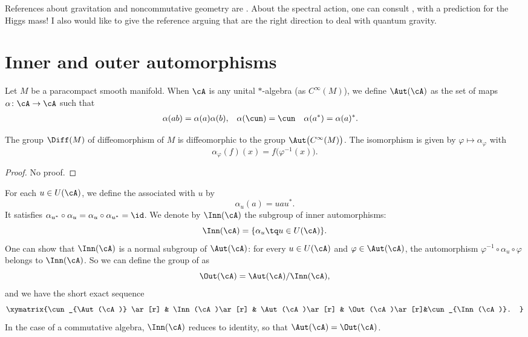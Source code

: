 
References about gravitation and noncommutative geometry are \cite{ConnesMotives,Landi,ConnesNCG,itoNCG_Varilly}. About the spectral action, one can consult \cite{SpectralActPrinciple}, with a prediction for the Higgs mass! I also would like to give the reference \cite{MrTopos} arguing that  are the right direction to deal with quantum gravity.

\section{Inner and outer automorphisms}

Let $M$ be a paracompact smooth manifold. When $\cA$ is any unital $*$-algebra (as $ C^{\infty}(M)$), we define $\Aut(\cA)$ as the set of maps $\alpha\colon \cA\to \cA$ such that
\begin{align}
	\alpha(ab) & =\alpha(a)\alpha(b),
	           & \alpha(\cun)         & =\cun
	           & \alpha(a^*)          & =\alpha(a)^*.
\end{align}

\begin{proposition}
	The group $\Diff(M)$ of diffeomorphism of $M$ is diffeomorphic to the group $\Aut\big(  C^{\infty}(M) \big)$. The isomorphism is given by $\varphi\mapsto\alpha_{\varphi}$ with
	\[
		\alpha_{\varphi}(f)(x)=f\big( \varphi^{-1}(x) \big).
	\]
\end{proposition}
\begin{proof}
	No proof.
\end{proof}

For each $u\in U(\cA)$, we define the  associated with $u$ by
\begin{equation}
	\alpha_u(a)=uau^*.
\end{equation}
It satisfies $\alpha_{u^*}\circ\alpha_{u}=\alpha_u\circ\alpha_{u^*}=\id$. We denote by $\Inn(\cA)$ the subgroup of inner automorphisms:
\[
	\Inn(\cA)=\{ \alpha_u\tq u\in U(\cA) \}.
\]
One can show that $\Inn(\cA)$ is a normal subgroup of $\Aut(\cA)$: for every $u\in U(\cA)$ and $\varphi\in\Aut(\cA)$, the automorphism $\varphi^{-1}\circ\alpha_u\circ\varphi$ belongs to $\Inn(\cA)$. So we can define the group of  as
\[
	\Out(\cA)=\Aut(\cA)/\Inn(\cA),
\]
and we have the short exact sequence
\begin{equation}
	\xymatrix{%
		\cun_{\Aut(\cA)} \ar[r]	&	\Inn(\cA)\ar[r]	&	\Aut(\cA)\ar[r]	&	\Out(\cA)\ar[r]&\cun_{\Inn(\cA)}.
	}
\end{equation}
In the case of a commutative algebra, $\Inn(\cA)$ reduces to identity, so that $\Aut(\cA)=\Out(\cA)$.


